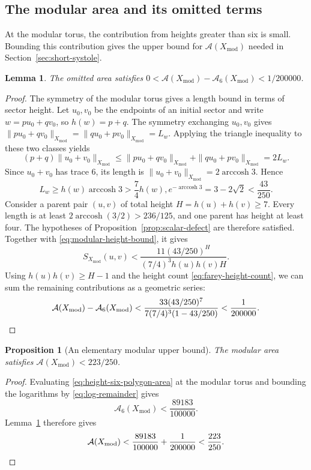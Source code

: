 \documentclass[10pt,twoside]{article}
\theoremstyle{plain}
\newtheorem{proposition}[theorem]{Proposition}
\newtheorem{lemma}[theorem]{Lemma}
\theoremstyle{definition}
\theoremstyle{remark}
\DeclareMathOperator{\arccosh}{arccosh}
\newcommand{\A}{\mathcal A}
\newcommand{\Xmod}{X_{\mathrm{mod}}}
\begin{document}
\subsection{The modular area and its omitted terms}
\label{sec:modular-area}

At the modular torus, the contribution from heights greater than
six is small. Bounding this contribution gives the upper bound
for $\A(\Xmod)$ needed in Section~\ref{sec:short-systole}.

\begin{lemma}
\label{lem:small-modular-remainder}
The omitted area satisfies
$0<\A(\Xmod)-\A_6(\Xmod)<1/200000$.
\end{lemma}
\begin{proof}
The symmetry of the modular torus gives a length bound in terms
of sector height. Let $u_0,v_0$ be the endpoints of an initial
sector and write $w=pu_0+qv_0$, so $h(w)=p+q$.
The symmetry exchanging $u_0,v_0$ gives
$\|pu_0+qv_0\|_{\Xmod}=\|qu_0+pv_0\|_{\Xmod}=L_w$.
Applying the triangle inequality to these two classes yields
$$
(p+q)\|u_0+v_0\|_{\Xmod}
\leq \|pu_0+qv_0\|_{\Xmod}+\|qu_0+pv_0\|_{\Xmod}
=2L_w.
$$
Since $u_0+v_0$ has trace $6$, its length is
$\|u_0+v_0\|_{\Xmod}=2\operatorname{arccosh}3$. Hence
\begin{equation}
\label{eq:modular-height-bound}
L_w\geq h(w)\operatorname{arccosh}3>\frac74h(w),
e^{-\operatorname{arccosh}3}=3-2\sqrt2<\frac{43}{250}.
\end{equation}
Consider a parent pair $(u,v)$ of total height $H=h(u)+h(v)\geq7$.
Every length is at least $2\arccosh(3/2)>236/125$, and one parent
has height at least four. The hypotheses of
Proposition~\ref{prop:scalar-defect} are therefore satisfied.
Together with \eqref{eq:modular-height-bound}, it gives
$$
S_{\Xmod}(u,v)<\frac{11(43/250)^H}{(7/4)^3h(u)h(v)H}.
$$
Using $h(u)h(v)\geq H-1$ and the height count
\eqref{eq:farey-height-count}, we can sum the remaining
contributions as a geometric series:
\begin{equation*}
\A(\Xmod)-\A_6(\Xmod)
<\frac{33(43/250)^7}{7(7/4)^3(1-43/250)}
<\frac1{200000}.
\qedhere
\end{equation*}
\end{proof}

\begin{proposition}[An elementary modular upper bound]
\label{prop:modular-upper-new}
The modular area satisfies $\A(\Xmod)<223/250$.
\end{proposition}
\begin{proof}
Evaluating \eqref{eq:height-six-polygon-area} at the modular torus
and bounding the logarithms by \eqref{eq:log-remainder} gives
$$
\A_6(\Xmod)<\frac{89183}{100000}.
$$
Lemma~\ref{lem:small-modular-remainder} therefore gives
\begin{equation*}
\A(\Xmod)<\frac{89183}{100000}+\frac1{200000}
<\frac{223}{250}.
\qedhere
\end{equation*}
\end{proof}
\end{document}
